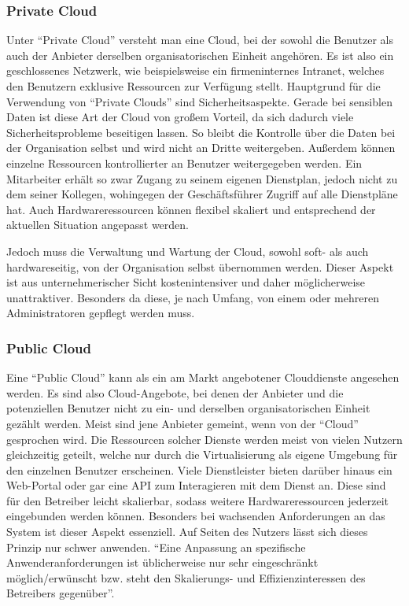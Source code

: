 \subsubsection{Private Cloud}
Unter "`Private Cloud"' versteht man eine Cloud, bei der sowohl die Benutzer als auch der Anbieter derselben organisatorischen Einheit angehören\cite[vgl.][Seite 25 f.]{baun10}.
Es ist also ein geschlossenes Netzwerk, wie beispielsweise ein firmeninternes Intranet, welches den Benutzern exklusive Ressourcen zur Verfügung stellt\cite[vgl.][Seite 40]{hoell11}.
Hauptgrund für die Verwendung von "`Private Clouds"' sind Sicherheitsaspekte.
Gerade bei sensiblen Daten ist diese Art der Cloud von großem Vorteil, da sich dadurch viele Sicherheitsprobleme beseitigen lassen.
So bleibt die Kontrolle über die Daten bei der Organisation selbst und wird nicht an Dritte weitergeben\cite[vgl.][Seite 26]{baun10}.
Außerdem können einzelne Ressourcen kontrollierter an Benutzer weitergegeben werden.
Ein Mitarbeiter erhält so zwar Zugang zu seinem eigenen Dienstplan, jedoch nicht zu dem seiner Kollegen, wohingegen der Geschäftsführer Zugriff auf alle Dienstpläne hat.
Auch Hardwareressourcen können flexibel skaliert und entsprechend der aktuellen Situation angepasst werden.

Jedoch muss die Verwaltung und Wartung der Cloud, sowohl soft- als auch hardwareseitig, von der Organisation selbst übernommen werden.
Dieser Aspekt ist aus unternehmerischer Sicht kostenintensiver und daher möglicherweise unattraktiver.
Besonders da diese, je nach Umfang, von einem oder mehreren Administratoren gepflegt werden muss.

\subsubsection{Public Cloud}
Eine "`Public Cloud"' kann als ein am Markt angebotener Clouddienste angesehen werden\cite[vgl.][Seite 38]{hoell11}.
Es sind also Cloud-Angebote, bei denen der Anbieter und die potenziellen Benutzer nicht zu ein- und derselben organisatorischen Einheit gezählt werden\cite[vgl.][Seite 25]{baun10}.
Meist sind jene Anbieter gemeint, wenn von der "`Cloud"' gesprochen wird.
Die Ressourcen solcher Dienste werden meist von vielen Nutzern gleichzeitig geteilt, welche nur durch die Virtualisierung als eigene Umgebung für den einzelnen Benutzer erscheinen.
Viele Dienstleister bieten darüber hinaus ein Web-Portal oder gar eine \ac{API} zum Interagieren mit dem Dienst an.
Diese sind für den Betreiber leicht skalierbar, sodass weitere Hardwareressourcen jederzeit eingebunden werden können.
Besonders bei wachsenden Anforderungen an das System ist dieser Aspekt essenziell.
Auf Seiten des Nutzers lässt sich dieses Prinzip nur schwer anwenden.
"`Eine Anpassung an spezifische Anwenderanforderungen ist üblicherweise nur sehr eingeschränkt möglich/erwünscht bzw. steht den Skalierungs- und Effizienzinteressen des Betreibers gegenüber"'\cite[Seite 39]{hoell11}.

